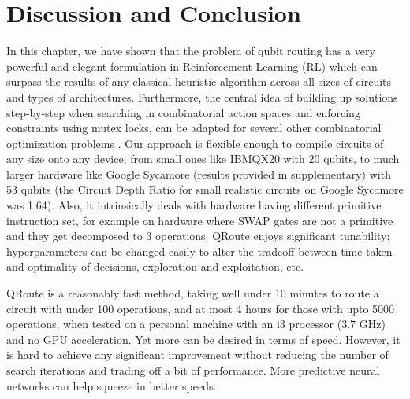 \section{\label{sec:discussion-conclusion}Discussion and Conclusion}

In this chapter, we have shown that the problem of qubit routing has a very powerful and elegant formulation in Reinforcement Learning (RL) which can surpass the results of any classical heuristic algorithm across all sizes of circuits and types of architectures. Furthermore, the central idea of building up solutions step-by-step when searching in combinatorial action spaces and enforcing constraints using mutex locks, can be adapted for several other combinatorial optimization problems \cite{comb_survey, comb_1, comb_2, comb_3, comb_4}. Our approach is flexible enough to compile circuits of any size onto any device, from small ones like IBMQX20 with 20 qubits, to much larger hardware like Google Sycamore (results provided in supplementary) with 53 qubits (the Circuit Depth Ratio for small realistic circuits on Google Sycamore was 1.64). Also, it intrinsically deals with hardware having different primitive instruction set, for example on hardware where SWAP gates are not a primitive and they get decomposed to 3 operations. QRoute enjoys significant tunability; hyperparameters can be changed easily to alter the tradeoff between time taken and optimality of decisions, exploration and exploitation, etc.

QRoute is a reasonably fast method, taking well under 10 minutes to route a circuit with under 100 operations, and at most 4 hours for those with upto 5000 operations, when tested on a personal machine with an i3 processor (3.7 GHz) and no GPU acceleration. Yet more can be desired in terms of speed. However, it is hard to achieve any significant improvement without reducing the number of search iterations and trading off a bit of performance. More predictive neural networks can help squeeze in better speeds.

